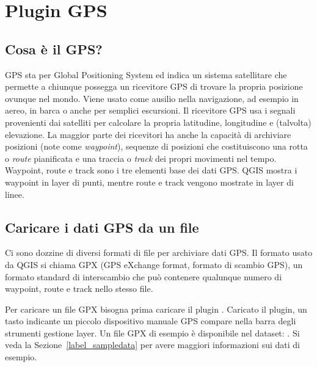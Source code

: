 
\section{Plugin GPS}\label{label_plugingps}


\subsection{Cosa è il GPS?}\label{whatsgps}

GPS sta per Global Positioning System ed indica un sistema satellitare che permette a chiunque possegga 
un ricevitore GPS di trovare la propria posizione ovunque nel mondo.
Viene usato come ausilio nella navigazione, ad esempio in aereo, in barca o anche per semplici escursioni.
Il ricevitore GPS usa i segnali provenienti dai satelliti per calcolare la propria latitudine, longitudine 
e (talvolta) elevazione.
La maggior parte dei ricevitori ha anche la capacità di archiviare posizioni (note come \emph{waypoint}), 
sequenze di posizioni che costituiscono una rotta o \emph{route} pianificata e una traccia o \emph{track} 
dei propri movimenti nel tempo.
Waypoint, route e track sono i tre elementi base dei dati GPS.
QGIS mostra i waypoint in layer di punti, mentre route e track vengono mostrate in layer di linee.

\subsection{Caricare i dati GPS da un file}\label{label_loadgps}

Ci sono dozzine di diversi formati di file per archiviare dati GPS. Il formato usato da QGIS si chiama GPX 
(GPS eXchange format, formato di scambio GPS), un formato standard di interscambio che può contenere 
qualunque numero di waypoint, route e track nello stesso file.

Per caricare un file GPX bisogna prima caricare il plugin
 \arrow {} \arrow 
{}. Caricato il plugin, un tasto indicante un piccolo dispositivo manuale GPS compare 
nella barra degli strumenti gestione layer. Un file GPX di esempio è disponibile nel dataset:
. Si veda la Sezione~\ref{label_sampledata} 
per avere maggiori informazioni sui dati di esempio.

